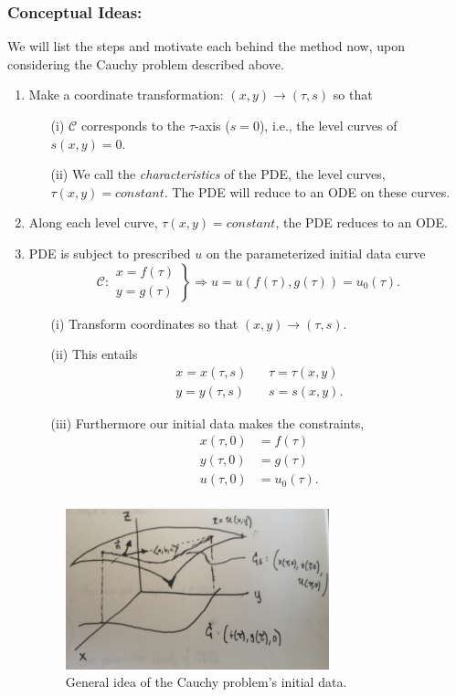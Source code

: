 \subsubsection{Conceptual Ideas:}

We will list the steps and motivate each behind the method now, upon considering the Cauchy problem described above.

\begin{enumerate}
\item Make a coordinate transformation: $(x,y) \rightarrow (\tau, s)$ so that
\begin{itemize}
\item[(i)] $\mathscr{C}$ corresponds to the $\tau$-axis ($s=0$), i.e., the level curves of $s(x,y)=0.$
\item[(ii)] We call the \emph{characteristics} of the PDE, the level curves, $\tau(x,y)=constant.$ The PDE will reduce to an ODE on these curves.
\end{itemize}

\item Along each level curve, $\tau(x,y)=constant$, the PDE reduces to an ODE. 

\item PDE is subject to prescribed $u$ on the parameterized initial data curve $$\mathscr{C}: \left. \begin{array}{c} x= f(\tau) \\ y = g(\tau) \end{array}\right\} \Rightarrow u=u(f(\tau),g(\tau)) = u_0(\tau).$$
\begin{itemize}
\item[(i)] Transform coordinates so that $(x,y)\rightarrow (\tau,s).$
\item[(ii)] This entails 
\begin{align*}
x = x(\tau,s) \ \ &\ \ \tau=\tau(x,y) \\
y = y(\tau,s) \ \ &\ \ s = s(x,y).
\end{align*}
\item[(iii)] Furthermore our initial data makes the constraints,
\begin{align*}
x(\tau,0) &= f(\tau) \\
y(\tau,0) &= g(\tau) \\
u(\tau,0) &= u_0(\tau). \\
\end{align*}
\end{itemize}

\begin{figure}[h!]
\centering
\includegraphics[width=3.0in]{moc_idea1.jpg}
\caption{General idea of the Cauchy problem's initial data.}
\label{moc_idea1}
\end{figure}


\end{enumerate}
